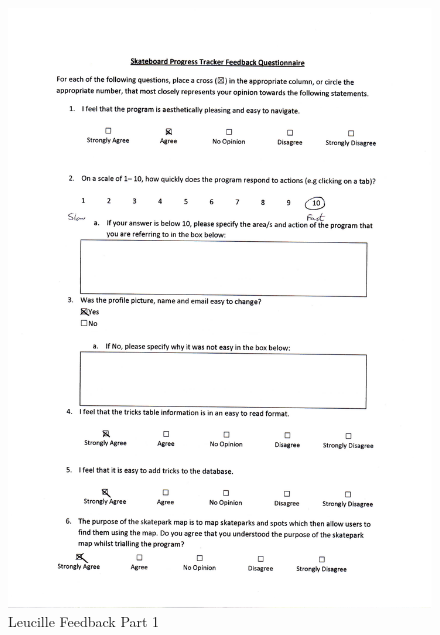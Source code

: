\begin{figure}[H]
    \includegraphics[width=\textwidth]{./Evaluation/images/LeucilleFeedback1.pdf}
    \caption{Leucille Feedback Part 1} \label{fig:LeucilleFeedback1}
\end{figure}

